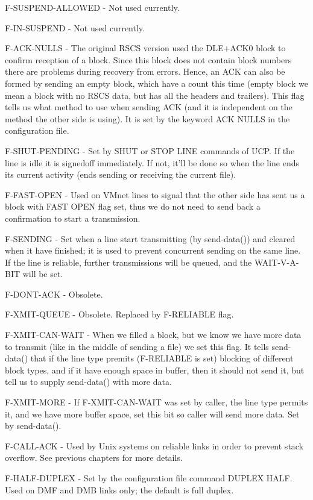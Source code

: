 F-SUSPEND-ALLOWED - Not used currently.

F-IN-SUSPEND - Not used currently.

F-ACK-NULLS  -  The  original  RSCS  version  used the DLE+ACK0 block to
confirm reception of a block. Since this block does  not  contain  block
numbers  there  are  problems during recovery from errors. Hence, an ACK
can also be formed by sending an empty block, which have  a  count  this
time  (empty  block  we  mean a block with no RSCS data, but has all the
headers and trailers). This flag  tells  us  what  method  to  use  when
sending  ACK  (and  it  is  independent  on the method the other side is
using). It is set by the keyword ACK NULLS in the configuration file.

F-SHUT-PENDING - Set by SHUT or STOP LINE commands of UCP. If  the  line
is  idle  it is signedoff immediately. If not, it'll be done so when the
line ends its current activity (ends sending or  receiving  the  current
file).

F-FAST-OPEN - Used on VMnet lines to signal that the other side has sent
us a block with FAST OPEN flag set, thus we do not need to send  back  a
confirmation to start a transmission.

F-SENDING  -  Set  when  a  line start transmitting (by send-data()) and
cleared when it have finished; it is used to prevent concurrent  sending
on the same line. If the line is reliable, further transmissions will be
queued, and the WAIT-V-A-BIT will be set.

F-DONT-ACK - Obsolete.

F-XMIT-QUEUE - Obsolete. Replaced by F-RELIABLE flag.

F-XMIT-CAN-WAIT - When we filled a block, but we know we have more  data
to  transmit (like in the middle of sending a file) we set this flag. It
tells send-data() that if the line  type  premits  (F-RELIABLE  is  set)
blocking  of  different  block  types,  and  if  it have enough space in
buffer, then it should not send it, but tell us  to  supply  send-data()
with more data.

F-XMIT-MORE  -  If  F-XMIT-CAN-WAIT  was  set  by  caller, the line type
permits it, and we have more buffer space, set this bit so  caller  will
send more data. Set by send-data().

F-CALL-ACK  - Used by Unix systems on reliable links in order to prevent
stack overflow. See previous chapters for more details.

F-HALF-DUPLEX - Set by the configuration file command DUPLEX HALF.  Used
on DMF and DMB links only; the default is full duplex.

